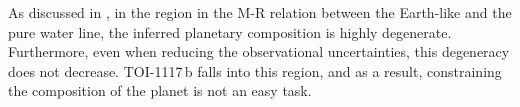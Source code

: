 \documentclass[fleqn,usenatbib,useAMS]{mnras}
\begin{document}
%
As discussed in \citet{Otegi_2020b}, in the region in the M-R relation between the Earth-like and the pure water line, the inferred planetary composition is highly degenerate.
Furthermore, even when reducing the observational uncertainties, this degeneracy does not decrease. TOI-1117\,b falls into this region, and as a result, constraining the composition of the planet is not an easy task. 
\end{document}
